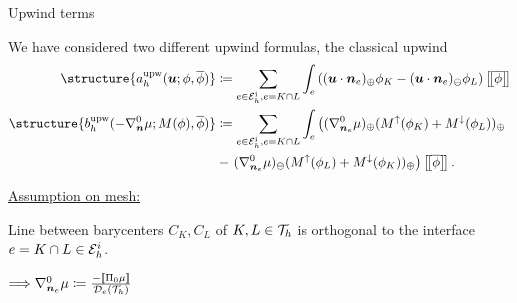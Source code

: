 \begin{frame}{Upwind terms}
    \small

We have considered two different upwind formulas, the classical upwind 
\begin{align*}
	\structure{\aupw{\uu}{\phi}{\bphi}}&\coloneqq \sum_{e\in\Ehi, e=K\cap L}\int_e\left( (\uu\cdot\nn_e)_\oplus\phi_K - (\uu\cdot\nn_e)_\ominus\phi_L\right)\salto{\bphi}\\
	\structure{\bupw{-\nabla_{\nn}^0\mu}{M(\phi)}{\bphi}}&\coloneqq\sum_{e\in\Ehi,e=K\cap L}\int_e\left((\nabla_{\nn_e}^0\mu)_\oplus(M^\uparrow(\phi_K)+M^\downarrow(\phi_L))_\oplus\right.\notag\\&-\left.(\nabla_{\nn_e}^0\mu)_\ominus(M^\uparrow(\phi_L)+M^\downarrow(\phi_K))_\oplus\right)\salto{\bphi}.
\end{align*}

\pause
\begin{minipage}{0.44\textwidth}
\underline{Assumption on mesh:}
    
    Line between barycenters $C_K, C_L$ of 
    $K,L\in\mathcal{T}_h$ is orthogonal to the interface $e=K\cap L\in\mathcal{E}_h^i$.
\end{minipage}
\hfill
\begin{minipage}{0.49\textwidth}
\end{minipage}
\vspace*{-0.2cm}
\begin{block}{}
    \alert{$\Longrightarrow \nabla_{{\bm{n}}_e}^0\mu\coloneqq\frac{-\left[\!\left[\Pi_0\mu\right]\!\right]}{\mathcal{D}_e(\mathcal{T}_h)}$} 
\end{block}
\end{frame}

